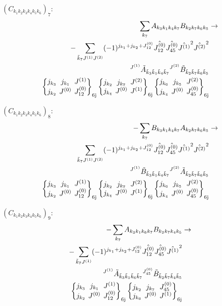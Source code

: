 \documentclass[11pt]{article}
\newcommand{\sixj}[6]{\begingroup\setlength{\arraycolsep}{0.2em}\begin{Bmatrix} #1 & #2 & #3 \\ #4 & #5 & #6 \end{Bmatrix}_{\text{6j}}\endgroup}
\begin{document}
$\left({C}_{{k}_{1}{k}_{2}{k}_{3}{k}_{4}{k}_{5}{k}_{6}}\right)_{7}$:
\begin{align}
\sum_{{k}_{7}}{A}_{{k}_{3}{k}_{1}{k}_{4}{k}_{7}}{B}_{{k}_{2}{k}_{7}{k}_{6}{k}_{5}}&\rightarrow \notag \\-\sum_{\tilde{k}_{7}J^{(1)}J^{(2)}}(-1)^{j_{{k}_{1}} +j_{{k}_{2}} +J^{(0)}_{12} }\hat{J^{(0)}_{12}}\hat{J^{(0)}_{45}}\hat{J^{(1)}}^{2}\hat{J^{(2)}}^{2}& \notag \\{}^{J^{(1)}}\tilde{A}_{\tilde{k}_{3}\tilde{k}_{1}\tilde{k}_{4}\tilde{k}_{7}}{}^{J^{(2)}}\tilde{B}_{\tilde{k}_{2}\tilde{k}_{7}\tilde{k}_{6}\tilde{k}_{5}}& \notag \\\sixj{j_{{k}_{3}}}{j_{{k}_{1}}}{J^{(1)}}{j_{{k}_{2}}}{J^{(0)}}{J^{(0)}_{12}}\sixj{j_{{k}_{2}}}{j_{{k}_{7}}}{J^{(2)}}{j_{{k}_{4}}}{J^{(0)}}{J^{(1)}}\sixj{j_{{k}_{6}}}{j_{{k}_{5}}}{J^{(2)}}{j_{{k}_{4}}}{J^{(0)}}{J^{(0)}_{45}}
\end{align}

$\left({C}_{{k}_{1}{k}_{2}{k}_{3}{k}_{4}{k}_{5}{k}_{6}}\right)_{8}$:
\begin{align}
-\sum_{{k}_{7}}{B}_{{k}_{3}{k}_{1}{k}_{4}{k}_{7}}{A}_{{k}_{2}{k}_{7}{k}_{6}{k}_{5}}&\rightarrow \notag \\\sum_{\tilde{k}_{7}J^{(1)}J^{(2)}}(-1)^{j_{{k}_{1}} +j_{{k}_{2}} +J^{(0)}_{12} }\hat{J^{(0)}_{12}}\hat{J^{(0)}_{45}}\hat{J^{(1)}}^{2}\hat{J^{(2)}}^{2}& \notag \\{}^{J^{(1)}}\tilde{B}_{\tilde{k}_{3}\tilde{k}_{1}\tilde{k}_{4}\tilde{k}_{7}}{}^{J^{(2)}}\tilde{A}_{\tilde{k}_{2}\tilde{k}_{7}\tilde{k}_{6}\tilde{k}_{5}}& \notag \\\sixj{j_{{k}_{3}}}{j_{{k}_{1}}}{J^{(1)}}{j_{{k}_{2}}}{J^{(0)}}{J^{(0)}_{12}}\sixj{j_{{k}_{2}}}{j_{{k}_{7}}}{J^{(2)}}{j_{{k}_{4}}}{J^{(0)}}{J^{(1)}}\sixj{j_{{k}_{6}}}{j_{{k}_{5}}}{J^{(2)}}{j_{{k}_{4}}}{J^{(0)}}{J^{(0)}_{45}}
\end{align}

$\left({C}_{{k}_{1}{k}_{2}{k}_{3}{k}_{4}{k}_{5}{k}_{6}}\right)_{9}$:
\begin{align}
-\sum_{{k}_{7}}{A}_{{k}_{3}{k}_{1}{k}_{6}{k}_{7}}{B}_{{k}_{2}{k}_{7}{k}_{4}{k}_{5}}&\rightarrow \notag \\-\sum_{\tilde{k}_{7}J^{(1)}}(-1)^{j_{{k}_{1}} +j_{{k}_{2}} +J^{(0)}_{12} }\hat{J^{(0)}_{12}}\hat{J^{(0)}_{45}}\hat{J^{(1)}}^{2}& \notag \\{}^{J^{(1)}}\tilde{A}_{\tilde{k}_{3}\tilde{k}_{1}\tilde{k}_{6}\tilde{k}_{7}}{}^{J^{(0)}_{45}}\tilde{B}_{\tilde{k}_{2}\tilde{k}_{7}\tilde{k}_{4}\tilde{k}_{5}}& \notag \\\sixj{j_{{k}_{3}}}{j_{{k}_{1}}}{J^{(1)}}{j_{{k}_{2}}}{J^{(0)}}{J^{(0)}_{12}}\sixj{j_{{k}_{2}}}{j_{{k}_{7}}}{J^{(0)}_{45}}{j_{{k}_{6}}}{J^{(0)}}{J^{(1)}}
\end{align}
\end{document}

